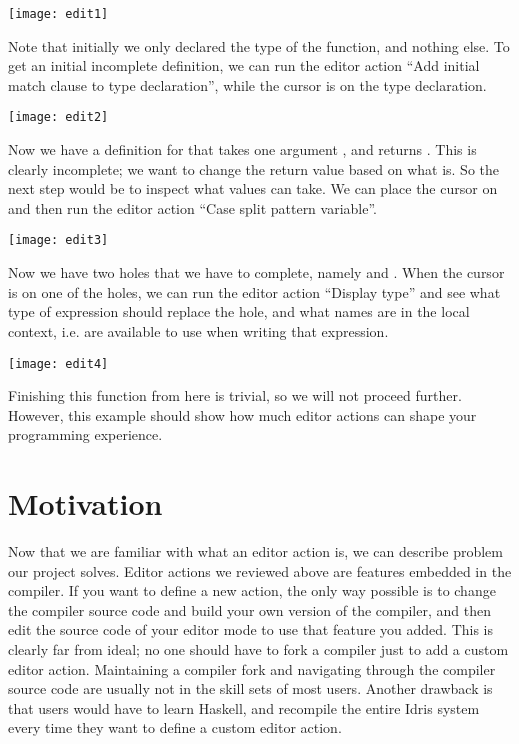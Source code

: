 \vspace{1em}
\texttt{[image: edit1]}

Note that initially we only declared the type of the function, and nothing
else. To get an initial incomplete definition, we can run the editor action
``Add initial match clause to type declaration'', while the cursor is on the
type declaration.

\vspace{1em}
\texttt{[image: edit2]}

Now we have a definition for  that takes one argument , and
returns . This is clearly incomplete; we want to change
the return value based on what  is. So the next step would be to inspect
what values  can take. We can place the cursor on  and then run the
editor action ``Case split pattern variable''.

\vspace{1em}
\texttt{[image: edit3]}

Now we have two holes that we have to complete, namely  and
. When the cursor is on one of the holes, we can run the
editor action ``Display type'' and see what type of expression should replace
the hole, and what names are in the local context, i.e. are available to use
when writing that expression.

\vspace{1em}
\texttt{[image: edit4]}

Finishing this function from here is trivial, so we will not proceed further.
However, this example should show how much editor actions can shape your
programming experience.

\section{Motivation}

Now that we are familiar with what an editor action is, we can describe problem
our project solves. Editor actions we reviewed above are features embedded
in the compiler. If you want to define a new action, the only way possible is
to change the compiler source code and build your own version of the compiler,
and then edit the source code of your editor mode to use that feature you
added. This is clearly far from ideal; no one should have to fork a compiler
just to add a custom editor action. Maintaining a compiler fork and
navigating through the compiler source code are usually not in the skill sets
of most users.
Another drawback is that users would have to learn Haskell, and recompile the
entire Idris system every time they want to define a custom editor action.

